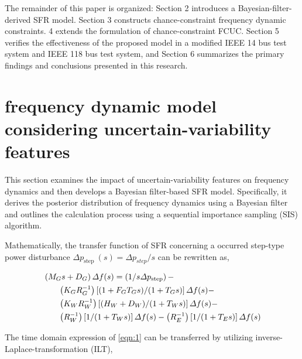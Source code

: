 \documentclass[lettersize,journal]{IEEEtran}
\begin{document}
The remainder of this paper is organized: Section {2} introduces a Bayesian-filter-derived SFR model. Section {3} constructs chance-constraint frequency dynamic constraints. {4} extends the
formulation of chance-constraint FCUC.  Section {5} verifies the effectiveness of the proposed model in a modified IEEE 14 bus test system and IEEE 118 bus test system, and Section {6} summarizes the
primary findings and conclusions presented in this research.

\vspace{-0.125in} \section{frequency dynamic model considering uncertain-variability features}

This section examines the impact of uncertain-variability features on frequency dynamics and then develops a Bayesian filter-based SFR model. Specifically, it derives the posterior distribution of
frequency dynamics using a Bayesian filter and outlines the calculation process using a sequential importance sampling (SIS) algorithm.

Mathematically, the transfer function of SFR concerning a occurred step-type power disturbance $\varDelta p_{\textrm{step }}(s)=\varDelta p_{{step }} / s$ can be rewritten as,

\vspace{-0.125in}
\begin{small}
	\begin{align}\label{eqn:1}
		 & \left(M_{G} s+D_{G}\right) \varDelta f(s)=\left({1/s} \varDelta p_{ \text{step}}\right)-                                                                          \\
		 & \qquad {\left({K_{G}}{ R_{G}^{-1}}\right)\left[ {\left(1+F_{G} T_{G} s\right)}/{\left(1+T_{G} s\right)}\right] \varDelta f(s)}- \notag                            \\
		 & \qquad {\left({K_W R_{W}^{-1}}\right)\left[{(H_W + D_W)}/{(1+T_{W} s)}\right] \varDelta f(s)} - \notag                                                            \\
		 & \qquad {\left({R_{W}^{-1}}\right)\left[{1}/({1+T_{W} s})\right] \varDelta f(s)} - {\left({R_{E}^{-1}}\right)\left[{1}/({1+T_{E} s})\right] \varDelta f(s)} \notag
	\end{align}
\end{small}

The time domain expression of \eqref{eqn:1} can be transferred by utilizing inverse-Laplace-transformation (ILT),
\end{document}
